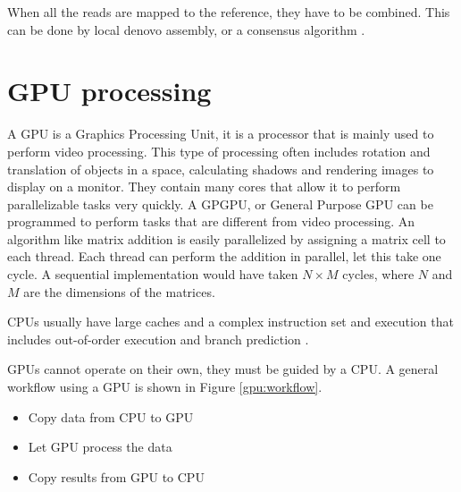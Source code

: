 \documentclass[../main/thesis.tex]{subfiles}
\begin{document}
When all the reads are mapped to the reference, they have to be combined.
This can be done by local denovo assembly, or a consensus algorithm \cite{consensus}.




\section{GPU processing}


A GPU is a Graphics Processing Unit, it is a processor that is mainly used to perform video processing.
This type of processing often includes rotation and translation of objects in a space, calculating shadows and rendering images to display on a monitor.
They contain many cores that allow it to perform parallelizable tasks very quickly.
A GPGPU, or General Purpose GPU can be programmed to perform tasks that are different from video processing.
An algorithm like matrix addition is easily parallelized by assigning a matrix cell to each thread.
Each thread can perform the addition in parallel, let this take one cycle.
A sequential implementation would have taken $N\times M$ cycles, where $N$ and $M$ are the dimensions of the matrices.

CPUs usually have large caches and a complex instruction set and execution that includes out-of-order execution and branch prediction \cite{CPUvsGPU1}\cite{CPUvsGPU2}.

GPUs cannot operate on their own, they must be guided by a CPU.
A general workflow using a GPU is shown in Figure \ref{gpu:workflow}.


\begin{itemize}
\item Copy data from CPU to GPU
\item Let GPU process the data
\item Copy results from GPU to CPU
\end{itemize}
\end{document}
